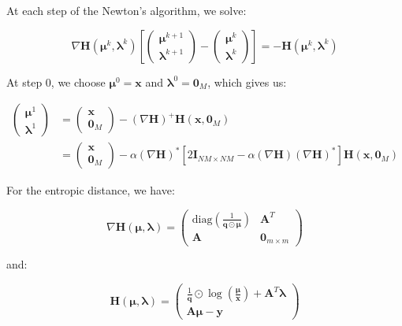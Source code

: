 \documentclass{tex/note}
\begin{document}
At each step of the Newton's algorithm, we solve:

\begin{equation*}
\nabla \bm{H} \left(\bm{\mu}^k , \bm{\lambda}^k \right) \left[ \begin{pmatrix} \bm{\mu}^{k + 1} \\ \bm{\lambda}^{k + 1} \end{pmatrix} - \begin{pmatrix} \bm{\mu}^k \\ \bm{\lambda}^k \end{pmatrix} \right] = - \bm{H} \left( \bm{\mu}^k , \bm{\lambda}^k \right)
\end{equation*}

At step 0, we choose $\bm{\mu}^0 = \bm{x}$ and $\bm{\lambda}^0 = \bm{0}_M$, which gives us:

\begin{align*}
\begin{pmatrix} \bm{\mu}^1 \\ \bm{\lambda}^1 \end{pmatrix} &= \begin{pmatrix} \bm{x} \\ \bm{0}_M \end{pmatrix} - \left( \nabla \bm{H} \right)^+ \bm{H} \left( \bm{x} , \bm{0}_M \right) \\
&= \begin{pmatrix} \bm{x} \\ \bm{0}_M \end{pmatrix} - \alpha \left( \nabla \bm{H} \right)^* \left[ 2 \bm{I}_{N M \times N M} - \alpha \left( \nabla \bm{H} \right) \left( \nabla \bm{H} \right)^* \right] \bm{H} \left( \bm{x} , \bm{0}_M \right)
\end{align*}

For the entropic distance, we have:

\begin{equation*}
\nabla \bm{H} \left( \bm{\mu} , \bm{\lambda} \right) = \begin{pmatrix} \text{diag} \left( \frac{1}{\bm{q} \odot \bm{\mu}} \right) & \bm{A}^T \\ \bm{A} & \bm{0}_{m \times m} \end{pmatrix}
\end{equation*}

and:

\begin{equation*}
\bm{H} \left( \bm{\mu} , \bm{\lambda} \right) = \begin{pmatrix} \frac{1}{\bm{q}} \odot \log \left( \frac{\bm{\mu}} {\bm{x}} \right) + \bm{A}^T \bm{\lambda} \\ \bm{A} \bm{\mu} - \bm{y} \end{pmatrix}
\end{equation*}
\end{document}
